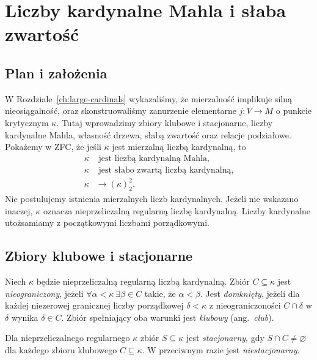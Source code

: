 \chapter{Liczby kardynalne Mahla i słaba zwartość}
\label{ch:mahlos-weak-compactness}

\section{Plan i założenia}
W Rozdziale~\ref{ch:large-cardinals} wykazaliśmy,
że mierzalność implikuje silną nieosiągalność,
oraz skonstruowaliśmy zanurzenie elementarne
$j:V\to M$ o punkcie krytycznym $\kappa$.
Tutaj wprowadzimy zbiory klubowe i stacjonarne,
liczby kardynalne Mahla, własność drzewa, słabą zwartość
oraz relacje podziałowe. Pokażemy w ZFC, że jeśli $\kappa$ jest
mierzalną liczbą kardynalną, to
\[
 \begin{aligned}
 \kappa&\text{ jest liczbą kardynalną Mahla},\\
 \kappa&\text{ jest słabo zwartą liczbą kardynalną},\\
 \kappa&\longrightarrow(\kappa)^2_2.
 \end{aligned}
\]
Nie postulujemy istnienia mierzalnych liczb kardynalnych.
Jeżeli nie wskazano inaczej, $\kappa$ oznacza
nieprzeliczalną regularną liczbę kardynalną.
Liczby kardynalne utożsamiamy z początkowymi liczbami porządkowymi.

\section{Zbiory klubowe i stacjonarne}

\begin{definicja}\label{def:lc38-club}
Niech $\kappa$ będzie nieprzeliczalną regularną
liczbą kardynalną. Zbiór $C\subseteq\kappa$
jest \emph{nieograniczony}, jeżeli
$\forall\alpha<\kappa\ \exists\beta\in C$
takie, że $\alpha<\beta$.
Jest \emph{domknięty}, jeżeli dla każdej
niezerowej granicznej liczby porządkowej
$\delta<\kappa$ z nieograniczoności
$C\cap\delta$ w $\delta$ wynika $\delta\in C$.
Zbiór spełniający oba warunki jest
\emph{klubowy} (ang.\ \emph{club}).
\end{definicja}

\begin{definicja}\label{def:lc38-stationary}
Dla nieprzeliczalnego regularnego $\kappa$
zbiór $S\subseteq\kappa$ jest
\emph{stacjonarny}, gdy
$S\cap C\ne\varnothing$ dla każdego
zbioru klubowego $C\subseteq\kappa$.
W przeciwnym razie jest
\emph{niestacjonarny}.
\end{definicja}

